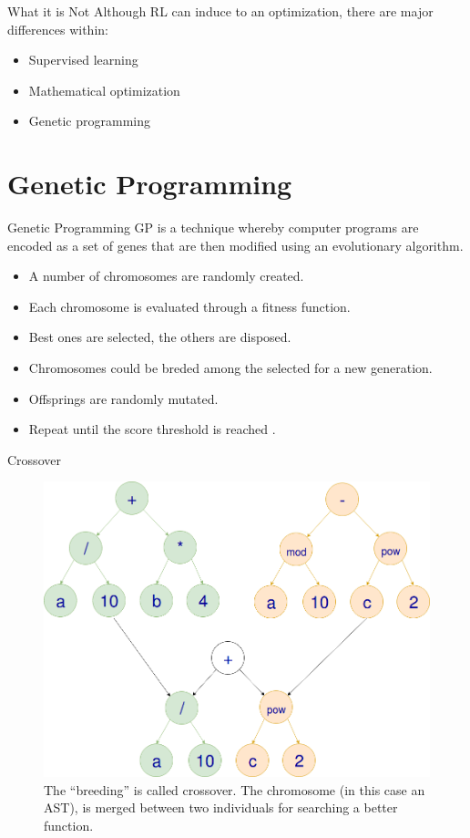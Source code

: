 \documentclass[10pt]{beamer}
\begin{document}
\begin{frame}[fragile]{What it is Not}
Although RL can induce to an optimization, there are major differences within:
  \begin{itemize}[<+- | alert@+>]
    \item {Supervised learning}
	\item Mathematical optimization
	\item Genetic programming
  \end{itemize}
\end{frame}

\section{Genetic Programming}
\begin{frame}{Genetic Programming}
	\textsc{GP} is a technique whereby computer programs are encoded as a set of genes that are then modified using an evolutionary algorithm.
	\begin{itemize}
		\item A number of chromosomes are randomly created.
		\item Each chromosome is evaluated through a fitness function.
		\item Best ones are selected, the others are disposed.
		\item Chromosomes could be breded among the selected for a new generation.
		\item Offsprings are randomly mutated.
		\item Repeat until the score threshold is reached \cite{gf-gp}.
	\end{itemize}
\end{frame}

\begin{frame}{Crossover}
	\begin{figure}
		\includegraphics[scale=0.15]{img/ast-crossover.png}
		\caption{The “breeding” is called crossover. The chromosome (in this case an \textsc{AST}), is merged between two individuals for searching a better function.}
	\end{figure}	
\end{frame}
\end{document}

